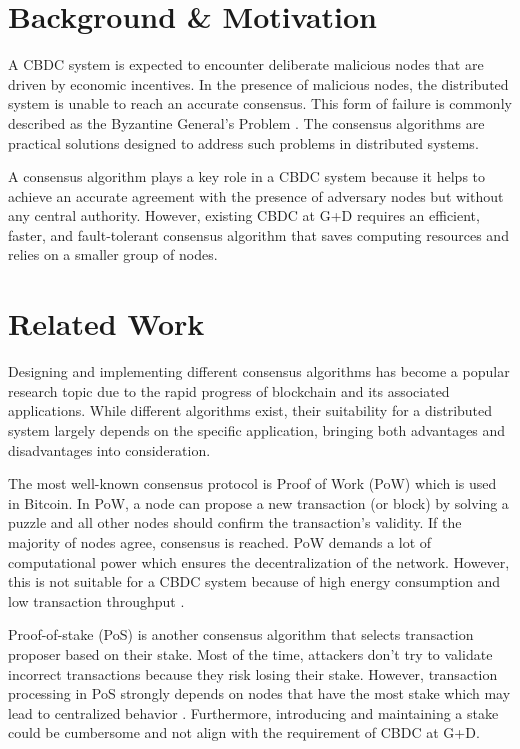 \documentclass[
  english,        %
  font=times,     %
  onecolumn,      %
]{tumarticle}
\begin{document}
\section{Background \& Motivation}
\hspace{2em} A CBDC system is expected to encounter deliberate malicious nodes that are driven by economic incentives. In the presence of malicious nodes, the distributed system is unable to reach an accurate consensus. This form of failure is commonly described as the Byzantine General's Problem \cite{lamport2019byzantine}. The consensus algorithms are practical solutions designed to address such problems in distributed systems. 

\hspace{1em} A consensus algorithm plays a key role in a CBDC system because it helps to achieve an accurate agreement with the presence of adversary nodes but without any central authority. However, existing CBDC at G+D requires an efficient, faster, and fault-tolerant consensus algorithm that saves computing resources and relies on a smaller group of nodes.

\section{Related Work}
\hspace{2em} Designing and implementing different consensus algorithms has become a popular research topic due to the rapid progress of blockchain and its associated applications. While different algorithms exist, their suitability for a distributed system largely depends on the specific application, bringing both advantages and disadvantages into consideration.

\hspace{1em} The most well-known consensus protocol is Proof of Work (PoW) which is used in Bitcoin. In PoW, a node can propose a new transaction (or block) by solving a puzzle and all other nodes should confirm the transaction's validity. If the majority of nodes agree, consensus is reached. PoW demands a lot of computational power which ensures the decentralization of the network. However, this is not suitable for a CBDC system because of high energy consumption and low transaction throughput \cite{bamakan2020survey}. 

\hspace{1em} Proof-of-stake (PoS) is another consensus algorithm that selects transaction proposer based on their stake. Most of the time, attackers don’t try to validate incorrect transactions because they risk losing their stake. However, transaction processing in PoS strongly depends on nodes that have the most stake which may lead to centralized behavior \cite{bamakan2020survey}. Furthermore, introducing and maintaining a stake could be cumbersome and not align with the requirement of CBDC at G+D. 
\end{document}
